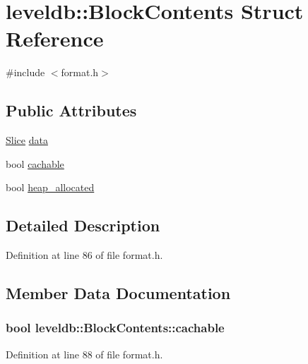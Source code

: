 \hypertarget{structleveldb_1_1_block_contents}{}\section{leveldb\+:\+:Block\+Contents Struct Reference}
\label{structleveldb_1_1_block_contents}


{\ttfamily \#include $<$format.\+h$>$}

\subsection*{Public Attributes}
\begin{DoxyCompactItemize}
\item 
\hyperlink{classleveldb_1_1_slice}{Slice} \hyperlink{structleveldb_1_1_block_contents_aa30fe6388fe0f89d5565f6bae788c28e}{data}
\item 
bool \hyperlink{structleveldb_1_1_block_contents_ad9cbcf81fb1378ce5f9a0db2e8d4b539}{cachable}
\item 
bool \hyperlink{structleveldb_1_1_block_contents_a0d4390fa3d4041ac5a3da51cbb16e315}{heap\+\_\+allocated}
\end{DoxyCompactItemize}


\subsection{Detailed Description}


Definition at line 86 of file format.\+h.



\subsection{Member Data Documentation}
\hypertarget{structleveldb_1_1_block_contents_ad9cbcf81fb1378ce5f9a0db2e8d4b539}{}
\subsubsection[{cachable}]{\setlength{\rightskip}{0pt plus 5cm}bool leveldb\+::\+Block\+Contents\+::cachable}\label{structleveldb_1_1_block_contents_ad9cbcf81fb1378ce5f9a0db2e8d4b539}


Definition at line 88 of file format.\+h.

